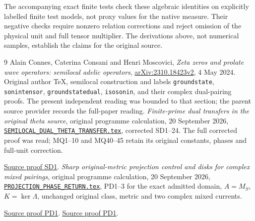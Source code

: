 \documentclass[11pt]{article}
\begin{document}
The accompanying exact finite tests check these algebraic identities
on explicitly labelled finite test models, not proxy values for the
native measure. Their negative checks require nonzero relation
corrections and reject omission of the physical unit and full
tensor multiplier. The derivations above, not numerical samples,
establish the claims for the original source.

\begin{thebibliography}{9}
 Alain Connes, Caterina Consani and Henri Moscovici,
\emph{Zeta zeros and prolate wave operators: semilocal adelic operators},
\href{https://arxiv.org/abs/2310.18423v2}{arXiv:2310.18423v2},
4 May 2024. Original author TeX, semilocal construction and labels
\texttt{groundstate}, \texttt{sonintensor}, \texttt{groundstatedual},
\texttt{isosonin}, and their complex dual-pairing proofs. The present
independent reading was bounded to that section; the parent source
provider records the full-paper reading.
 \emph{Finite-prime dual transfers in the original theta
source}, original programme calculation, 20 September 2026,
\href{https://github.com/KokunoYumeto/zeta-function-research-reader/blob/5992ad50c0f2a06921f1fcaded7b4e38097c0739/workbenches/splitzero-tandem/continuations/20260920-original-kernel-mixed-determinants/providers/SEMILOCAL_DUAL_THETA_TRANSFER.tex\#L1}{\texttt{SEMILOCAL\_DUAL\_THETA\_TRANSFER.tex}}, corrected SD1--24.
The full corrected proof was read; MQ1--10 and MQ40--45 retain its
original constants, phases and full-unit correction.

\href{https://github.com/KokunoYumeto/zeta-function-research-reader/blob/5992ad50c0f2a06921f1fcaded7b4e38097c0739/workbenches/splitzero-tandem/continuations/20260920-original-kernel-mixed-determinants/providers/SEMILOCAL_DUAL_THETA_TRANSFER.tex\#L27}{Source proof SD1}.
 \emph{Sharp original-metric projection control and disks
for complex mixed pairings}, original programme calculation,
20 September 2026, \href{https://github.com/KokunoYumeto/zeta-function-research-reader/blob/5992ad50c0f2a06921f1fcaded7b4e38097c0739/workbenches/splitzero-tandem/continuations/20260920-original-kernel-mixed-determinants/providers/PROJECTION_PHASE_RETURN.tex\#L1}{\texttt{PROJECTION\_PHASE\_RETURN.tex}},
PD1--3 for the exact admitted domain, $A=M_S$, $K=\ker\Lambda$,
unchanged original class, metric and two complex mixed currents.

\href{https://github.com/KokunoYumeto/zeta-function-research-reader/blob/5992ad50c0f2a06921f1fcaded7b4e38097c0739/workbenches/splitzero-tandem/continuations/20260920-original-kernel-mixed-determinants/providers/PROJECTION_PHASE_DERIVATION.tex\#L22}{Source proof PD1}. \href{https://github.com/KokunoYumeto/zeta-function-research-reader/blob/5992ad50c0f2a06921f1fcaded7b4e38097c0739/workbenches/splitzero-tandem/continuations/20260920-original-kernel-mixed-determinants/providers/PROJECTION_PHASE_RETURN.tex\#L25}{Source proof PD1}.
\end{thebibliography}
\end{document}
